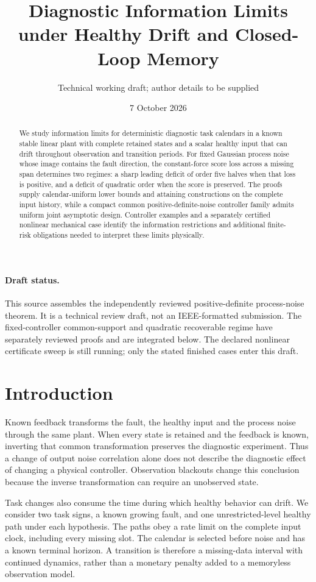 \documentclass[11pt]{article}
\title{Diagnostic Information Limits under Healthy Drift and Closed-Loop Memory}
\author{Technical working draft; author details to be supplied}
\date{7 October 2026}
\begin{document}
\maketitle
\begin{abstract}
We study information limits for deterministic diagnostic task calendars
in a known stable linear plant with complete retained states and a scalar
healthy input that can drift throughout observation and transition periods.
For fixed Gaussian process noise whose image contains the fault direction,
the constant-force score loss across a missing span determines two regimes:
a sharp leading deficit of order five halves when that loss is positive,
and a deficit of quadratic order when the score is preserved.
The proofs supply calendar-uniform lower bounds and attaining constructions
on the complete input history, while a compact common positive-definite-noise
controller family admits uniform joint asymptotic design.
Controller examples and a separately certified nonlinear mechanical case
identify the information restrictions and additional finite-risk obligations
needed to interpret these limits physically.
\end{abstract}

\paragraph{Draft status.}
This source assembles the independently reviewed positive-definite process-noise
theorem. It is a technical review draft, not an IEEE-formatted submission.
The fixed-controller common-support and quadratic recoverable regime
have separately reviewed proofs and are integrated below.
The declared nonlinear
certificate sweep is still running; only the stated finished cases enter this draft.

\section{Introduction}
Known feedback transforms the fault, the healthy input and the process noise
through the same plant. When every state is retained and the feedback is known,
inverting that common transformation preserves the diagnostic experiment.
Thus a change of output noise correlation alone does not describe the diagnostic
effect of changing a physical controller. Observation blackouts change this
conclusion because the inverse transformation can require an unobserved state.

Task changes also consume the time during which healthy behavior can drift.
We consider two task signs, a known growing fault, and one unrestricted-level
healthy path under each hypothesis. The paths obey a rate limit on the complete
input clock, including every missing slot. The calendar is selected before noise
and has a known terminal horizon. A transition is therefore a missing-data
interval with continued dynamics, rather than a monetary penalty added to a
memoryless observation model.
\end{document}
